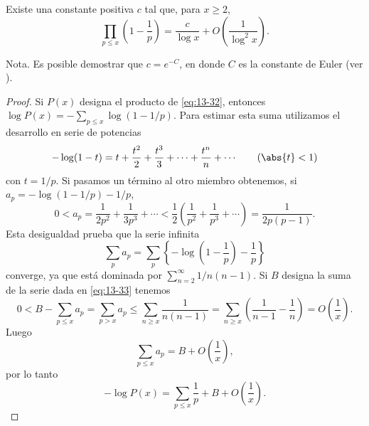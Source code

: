     \begin{teorema}\label{teo:13-13}
        Existe una constante positiva $c$ tal que, para $x\geq2$,
        \begin{equation}\label{eq:13-32}
            \prod_{p\leq x}\left(1-\frac{1}{p}\right)=\frac{c}{\log x}+O\left(\frac{1}{\log^2x}\right).
        \end{equation}
    \end{teorema}

    Nota. Es posible demostrar que $c=e^{-C}$, en donde $C$ es la constante de Euler (ver
    \cite{hardywright1960}).

    \begin{proof}
        Si $P(x)$ designa el producto de \eqref{eq:13-32}, entonces
        $\log P(x)=-\sum_{p\leq x}\log(1-1/p)$. Para estimar esta suma utilizamos el desarrollo
        en serie de potencias
        \begin{equation*}
            -\log(1-t)=t+\frac{t^2}{2}+\frac{t^3}{3}+\cdots+\frac{t^n}{n}+\cdots\qquad(\abs{t}<1)
        \end{equation*}
        con $t=1/p$. Si pasamos un término al otro miembro obtenemos, si
        $a_p=-\log(1-1/p)-1/p$,
        \begin{equation*}
            0<a_p=\frac{1}{2p^2}+\frac{1}{3p^3}+\cdots<\frac{1}{2}\left(\frac{1}{p^2}+\frac{1}{p^3}+\cdots\right)=\frac{1}{2p(p-1)}.
        \end{equation*}
        Esta desigualdad prueba que la serie infinita
        \begin{equation}\label{eq:13-33}
            \sum_pa_p=\sum_p\left\{-\log\left(1-\frac{1}{p}\right)-\frac{1}{p}\right\}
        \end{equation}
        converge, ya que está dominada por $\sum_{n=2}^{\infty}1/n(n-1)$. Si $B$ designa la suma
        de la serie dada en \eqref{eq:13-33} tenemos
        \begin{equation*}
            0<B-\sum_{p\leq x}a_p=\sum_{p>x}a_p\leq\sum_{n\geq x}\frac{1}{n(n-1)}=\sum_{n\geq x}\left(\frac{1}{n-1}-\frac{1}{n}\right)=O\left(\frac{1}{x}\right).
        \end{equation*}
        Luego
        \begin{equation*}
            \sum_{p\leq x}a_p=B+O\left(\frac{1}{x}\right),
        \end{equation*}
        por lo tanto
        \begin{equation*}
            -\log P(x)=\sum_{p\leq x}\frac{1}{p}+B+O\left(\frac{1}{x}\right).
        \end{equation*}

\end{proof}
